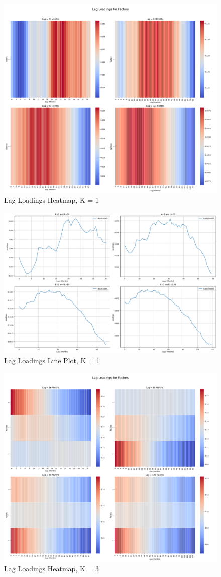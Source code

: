 \documentclass{article}
\begin{document}
\begin{figure}[H]
    \centering
    \includegraphics[width=0.85\linewidth]{W_1.png}
    \caption{Lag Loadings Heatmap, K = 1}
    \label{fig:W_1}
\end{figure}
\begin{figure}[H]
    \centering
    \includegraphics[width=0.85\linewidth]{W_1_line.png}
    \caption{Lag Loadings Line Plot, K = 1}
    \label{fig:W_1_line}
\end{figure}
\begin{figure}[H]
    \centering
    \includegraphics[width=0.85\linewidth]{W_3.png}
    \caption{Lag Loadings Heatmap, K = 3}
    \label{fig:W_3}
\end{figure}
\end{document}

